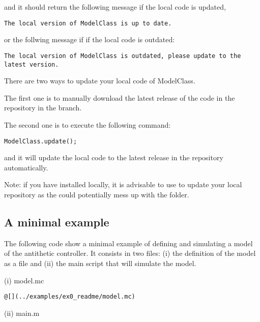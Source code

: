 \documentclass[11pt]{article}
\begin{document}
and it should return the following message if the local code is updated,

\begin{lstlisting}
The local version of ModelClass is up to date.
\end{lstlisting}

or the follwing message if if the local code is outdated:

\begin{lstlisting}
The local version of ModelClass is outdated, please update to the latest version.
\end{lstlisting}

There are two ways to update your local code of ModelClass.

The first one is to manually download the latest release of the code in the repository in the  branch.

The second one is to execute the following command:

\begin{lstlisting}
ModelClass.update();
\end{lstlisting}

and it will update the local code to the latest release in the repository automatically. 

Note: if you have  installed locally, it is advisable to use  to update your local repository as the  could potentially mess up with the  folder.

\subsection{A minimal example}

The following code show a minimal example of defining and simulating a model of the antithetic controller. It consists in two files: (i) the definition of the model as a  file and (ii) the main script that will simulate the model. 

(i) model.mc 

\begin{lstlisting}
@[](../examples/ex0_readme/model.mc)
\end{lstlisting}

(ii) main.m
\end{document}
